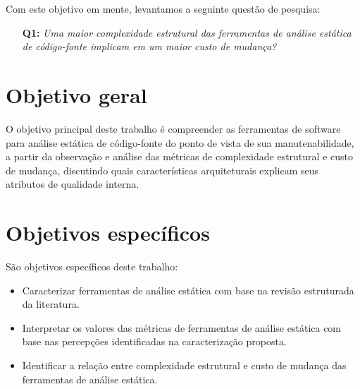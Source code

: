 Com este objetivo em mente, levantamos a seguinte questão de pesquisa:

\begin{enumerate}
  \item [{\bf Q1:}] {\em Uma maior complexidade estrutural das ferramentas de
  análise estática de código-fonte implicam em um maior custo de mudança?}
\end{enumerate}

\section{Objetivo geral}

O objetivo principal deste trabalho é compreender as ferramentas de software
para análise estática de código-fonte do ponto de vista de sua
manutenabilidade, a partir da observação e análise das métricas de complexidade
estrutural e custo de mudança, discutindo quais características arquiteturais
explicam seus atributos de qualidade interna.

\section{Objetivos específicos}

São objetivos específicos deste trabalho:

\begin{itemize}
  \item Caracterizar ferramentas de análise estática com base na revisão
        estruturada da literatura.
  \item Interpretar os valores das métricas de ferramentas de análise estática
        com base nas percepções identificadas na caracterização proposta.
  \item Identificar a relação entre complexidade estrutural e custo de mudança 
        das ferramentas de análise estática.
\end{itemize}

